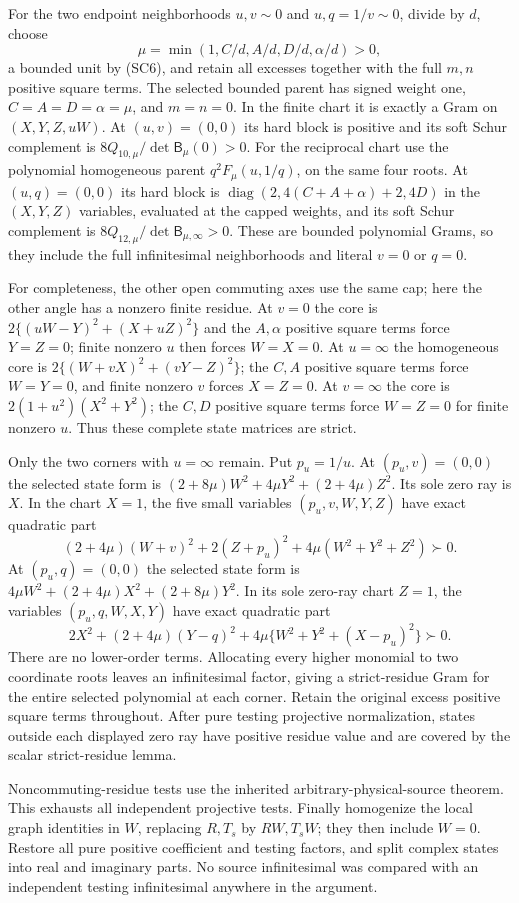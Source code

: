 For the two endpoint neighborhoods $u,v\sim0$ and
$u,q=1/v\sim0$, divide by $d$, choose
\[
 \mu=\min(1,C/d,A/d,D/d,\alpha/d)>0,
\]
a bounded unit by (SC6), and retain all excesses together with
the full $m,n$ positive square terms. The selected bounded parent has signed
weight one, $C=A=D=\alpha=\mu$, and $m=n=0$.
In the finite chart it is exactly a Gram on $(X,Y,Z,uW)$.
At $(u,v)=(0,0)$ its hard block is positive and its soft Schur
complement is $8Q_{10,\mu}/\det\mathsf B_\mu(0)>0$.
For the reciprocal chart use the polynomial homogeneous parent
$q^2F_\mu(u,1/q)$, on the same four roots. At $(u,q)=(0,0)$
its hard block is
$\operatorname{diag}(2,4(C+A+\alpha)+2,4D)$ in the
$(X,Y,Z)$ variables, evaluated at the capped weights, and its
soft Schur complement is
$8Q_{12,\mu}/\det\mathsf B_{\mu,\infty}>0$.
These are bounded polynomial Grams, so they include the full
infinitesimal neighborhoods and literal $v=0$ or $q=0$.

For completeness, the other open commuting axes use the same cap;
here the other angle has a nonzero finite residue.
At $v=0$ the core is $2\{(uW-Y)^2+(X+uZ)^2\}$ and the
$A,\alpha$ positive square terms force $Y=Z=0$; finite nonzero $u$ then forces
$W=X=0$. At $u=\infty$ the homogeneous core is
$2\{(W+vX)^2+(vY-Z)^2\}$; the $C,A$ positive square terms force $W=Y=0$,
and finite nonzero $v$ forces $X=Z=0$. At $v=\infty$ the core
is $2(1+u^2)(X^2+Y^2)$; the $C,D$ positive square terms force $W=Z=0$
for finite nonzero $u$. Thus these complete state matrices are strict.

Only the two corners with $u=\infty$ remain. Put $p_u=1/u$.
At $(p_u,v)=(0,0)$ the selected state form is
$(2+8\mu)W^2+4\mu Y^2+(2+4\mu)Z^2$.
Its sole zero ray is $X$. In the chart $X=1$, the five small
variables $(p_u,v,W,Y,Z)$ have exact quadratic part
\[
 (2+4\mu)(W+v)^2+2(Z+p_u)^2+4\mu(W^2+Y^2+Z^2)\succ0.
\]
At $(p_u,q)=(0,0)$ the selected state form is
$4\mu W^2+(2+4\mu)X^2+(2+8\mu)Y^2$.
In its sole zero-ray chart $Z=1$, the variables
$(p_u,q,W,X,Y)$ have exact quadratic part
\[
 2X^2+(2+4\mu)(Y-q)^2+4\mu\{W^2+Y^2+(X-p_u)^2\}\succ0.
\]
There are no lower-order terms. Allocating every higher monomial
to two coordinate roots leaves an infinitesimal factor, giving a
strict-residue Gram for the entire selected polynomial at each
corner. Retain the original excess positive square terms throughout.
After pure testing projective normalization, states outside each
displayed zero ray have positive residue value and are covered by
the scalar strict-residue lemma.

Noncommuting-residue tests use the inherited arbitrary-physical-source
theorem. This exhausts all independent projective tests. Finally
homogenize the local graph identities in $W$, replacing $R,T_s$
by $RW,T_sW$; they then include $W=0$. Restore all pure positive
coefficient and testing factors, and split complex states into real
and imaginary parts. No source infinitesimal was compared with an
independent testing infinitesimal anywhere in the argument.

